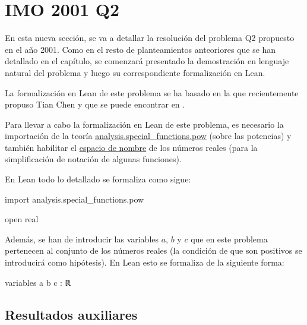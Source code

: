 \section{IMO 2001 Q2}

En esta nueva sección, se va a detallar la resolución del problema Q2
propuesto en el año 2001. Como en el resto de planteamientos anteoriores
que se han detallado en el capítulo, se comenzará presentado la
demostración en lenguaje natural del problema y luego su correspondiente
formalización en Lean.

La formalización en Lean de este problema se ha basado en la que
recientemente propuso Tian Chen y que se puede encontrar en \cite{TCC}.

\noindent
{}

Para llevar a cabo la formalización en Lean de este problema, es
necesario la importación de la teoría
\href{https://github.com/leanprover-community/mathlib/blob/master/src/analysis/special_functions/pow.lean}
{analysis.special\_functions.pow} (sobre las potencias) y también
habilitar el
\href{https://leanprover.github.io/reference/other_commands.html#namespaces}
{espacio de nombre} de los números reales (para la simplificación de
notación de algunas funciones).

En Lean todo lo detallado se formaliza como sigue:
\begin{leancode}
import analysis.special_functions.pow

open real
\end{leancode}

Además, se han de introducir las variables \(a\), \(b\) y \(c\) que en
este problema pertenecen al conjunto de los números reales (la condición
de que son positivos se introducirá como hipótesis). En Lean esto se
formaliza de la siguiente forma:
\begin{leancode}
variables {a b c : ℝ}
\end{leancode}

\subsection{Resultados auxiliares}

